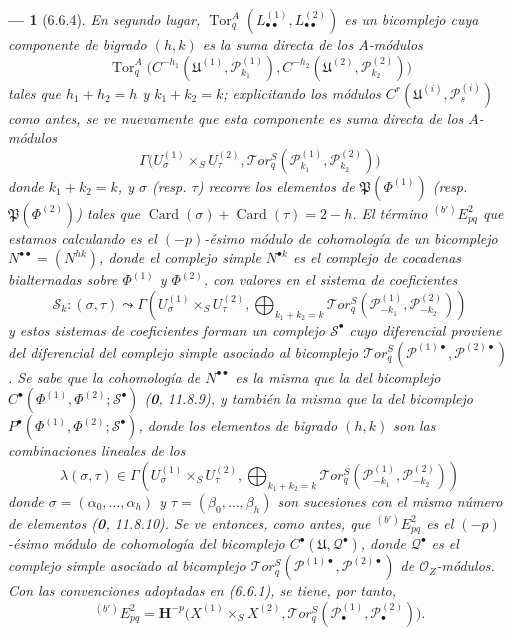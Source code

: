\documentclass[10pt,oneside,openany]{book}
\theoremstyle{egaenv}\newtheorem*{env}{---}
\theoremstyle{egastatement}
\theoremstyle{egadescription}
\begin{document}
\begin{env}[6.6.4]
En segundo lugar,
$\operatorname{Tor}_q^A(L_{\bullet\bullet}^{(1)},L_{\bullet\bullet}^{(2)})$ es un
bicomplejo cuya componente de bigrado $(h,k)$ es la suma directa de los
$A$-módulos
\[
  \operatorname{Tor}_q^A
  \bigl(C^{-h_1}(\mathfrak U^{(1)},\mathscr P_{k_1}^{(1)}),
        C^{-h_2}(\mathfrak U^{(2)},\mathscr P_{k_2}^{(2)})\bigr)
\]
tales que $h_1+h_2=h$ y $k_1+k_2=k$; explicitando los módulos
$C^r(\mathfrak U^{(i)},\mathscr P_s^{(i)})$ como antes, se ve nuevamente que
esta componente es suma directa de los $A$-módulos
\[
  \Gamma\bigl(U_\sigma^{(1)}\times_S U_\tau^{(2)},
    \mathscr{T}\!or_q^S
    (\mathscr P_{k_1}^{(1)},\mathscr P_{k_2}^{(2)})\bigr)
\]
donde $k_1+k_2=k$, y $\sigma$ (resp. $\tau$) recorre los elementos
de $\mathfrak P(\Phi^{(1)})$ (resp.
$\mathfrak P(\Phi^{(2)})$) tales que
$\operatorname{Card}(\sigma)+\operatorname{Card}(\tau)=2-h$. El término
${}^{(b')}E_{pq}^2$ que estamos calculando es el $(-p)$-ésimo módulo
de cohomología de un bicomplejo $N^{\bullet\bullet}=(N^{hk})$, donde el
complejo simple $N^{\bullet k}$ es el complejo de cocadenas \emph{bialternadas} sobre
$\Phi^{(1)}$ y $\Phi^{(2)}$, con valores en el sistema de coeficientes
\[
  \mathscr S_k:(\sigma,\tau)\leadsto
  \Gamma\left(U_\sigma^{(1)}\times_S U_\tau^{(2)},
    \bigoplus_{k_1+k_2=k}
    \mathscr{T}\!or_q^S
    (\mathscr P_{-k_1}^{(1)},\mathscr P_{-k_2}^{(2)})\right)
\]
y estos sistemas de coeficientes forman un \emph{complejo} $\mathscr S^\bullet$ cuyo
diferencial proviene del diferencial del complejo simple asociado al bicomplejo
$\mathscr{T}\!or_q^S
(\mathscr P^{(1)\bullet},\mathscr P^{(2)\bullet})$. Se sabe que la
cohomología de $N^{\bullet\bullet}$ es la misma que la del bicomplejo
$C^\bullet(\Phi^{(1)},\Phi^{(2)};\mathscr S^\bullet)$
(\textbf{0}, 11.8.9), y también la misma que la del bicomplejo
$P^\bullet(\Phi^{(1)},\Phi^{(2)};\mathscr S^\bullet)$, donde los elementos de
bigrado $(h,k)$ son las combinaciones lineales de los
\[
  \lambda(\sigma,\tau)\in
  \Gamma\left(U_\sigma^{(1)}\times_S U_\tau^{(2)},
    \bigoplus_{k_1+k_2=k}
    \mathscr{T}\!or_q^S
    (\mathscr P_{-k_1}^{(1)},\mathscr P_{-k_2}^{(2)})\right)
\]
donde $\sigma=(\alpha_0,\ldots,\alpha_h)$ y
$\tau=(\beta_0,\ldots,\beta_h)$ son sucesiones con el \emph{mismo número de
elementos} (\textbf{0}, 11.8.10). Se ve entonces, como antes, que
${}^{(b')}E_{pq}^2$ es el $(-p)$-ésimo módulo de cohomología del
bicomplejo $C^\bullet(\mathfrak U,\mathscr Q^\bullet)$, donde
$\mathscr Q^\bullet$ es el complejo simple asociado al bicomplejo
$\mathscr{T}\!or_q^S
(\mathscr P^{(1)\bullet},\mathscr P^{(2)\bullet})$ de
$\mathscr O_Z$-módulos. Con las convenciones adoptadas en (6.6.1), se tiene,
por tanto,
\[
  {}^{(b')}E_{pq}^2
  =\mathbf H^{-p}\bigl(X^{(1)}\times_S X^{(2)},
    \mathscr{T}\!or_q^S
    (\mathscr P_\bullet^{(1)},\mathscr P_\bullet^{(2)})\bigr).
\]
\end{env}
\end{document}
